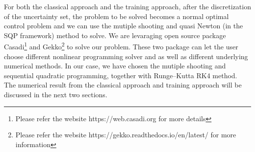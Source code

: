 \documentclass  [
  paper    = a4,
  BCOR     = 10mm,
  twoside,
  fontsize = 12pt,
  fleqn,
  toc      = bibnumbered,
  toc      = listofnumbered,
  numbers  = noendperiod,
  headings = normal,
  listof   = leveldown,
  version  = 3.03
]                                       {scrreprt}
\newcommand{\<}{\langle}
\renewcommand{\>}{\rangle}
\begin{document}
For both the classical approach and the training approach, after the discretization of the uncertainty set, the problem to be solved becomes a normal optimal control problem and we can use the mutiple shooting and quasi Newton (in the SQP framework) method to solve. We are levaraging open source package Casadi\footnote{Please refer the website https://web.casadi.org for more details} and Gekko\footnote{Please refer the website https://gekko.readthedocs.io/en/latest/ for more information} to solve our problem. These two package can let the user choose different nonlinear programming solver and as well as different underlying numerical methods. In our case, we have chosen the mutiple shooting and sequential quadratic programming, together with Runge–Kutta RK4 method. The numerical result from the classical approach and training approach will be discussed in the next two sections. 
\end{document}
